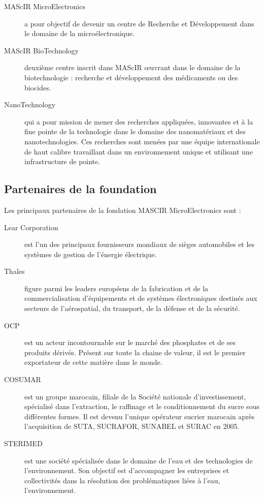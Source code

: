 \documentclass[11pt, a4paper, twoside]{book}
\begin{document}
\begin{description}
\item[MAScIR MicroElectronics] a pour objectif de devenir un centre de Recherche et Développement dans le domaine de la microélectronique.
\item[MAScIR BioTechnology] deuxième centre inscrit dans MAScIR œuvrant dans le domaine de la biotechnologie : recherche et développement des médicaments ou des biocides.
\item[NanoTechnology] qui a pour mission de mener des recherches appliquées, innovantes et à la fine pointe de la technologie dans le domaine des nanomatériaux et des nanotechnologies. Ces recherches sont menées par une équipe internationale de haut calibre travaillant dans un environnement unique et utilisant une infrastructure de pointe.
\end{description}

\subsection{Partenaires de la foundation}
Les principaux partenaires de la fondation MASCIR MicroElectronics sont :
\begin{description}
\item[Lear Corporation] est l’un des principaux fournisseurs mondiaux de sièges automobiles et les systèmes de gestion de l’énergie électrique.
\item[Thales] figure parmi les leaders européens de la fabrication et de la commercialisation d'équipements et de systèmes électroniques destinés aux secteurs de l'aérospatial, du transport, de la défense et de la sécurité.
\item[OCP] est un acteur incontournable sur le marché des phosphates et de ses produits dérivés. Présent sur toute la chaine de valeur, il est le premier exportateur de cette matière dans le monde.
\item[COSUMAR] est un groupe marocain, filiale de la Société nationale d'investissement, spécialisé dans l'extraction, le raffinage et le conditionnement du sucre sous différentes formes. Il est devenu l'unique opérateur sucrier marocain après l'acquisition de SUTA, SUCRAFOR, SUNABEL et SURAC en 2005.
\item[STERIMED] est une société spécialisée dans le domaine de l’eau et des technologies de l’environnement. Son objectif est d’accompagner les entreprises et collectivités dans la résolution des problématiques liées à l’eau, l’environnement.
\end{description}
\end{document}

